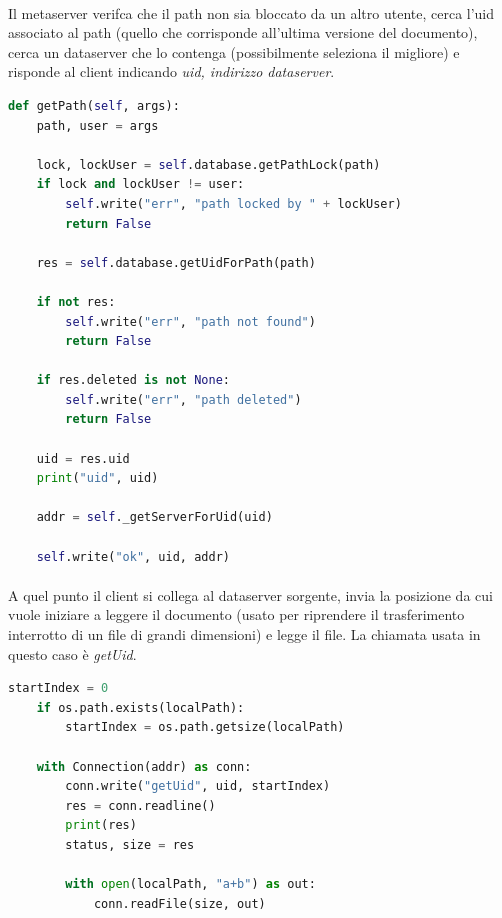 \documentclass{article}
\begin{document}
\paragraph{} Il metaserver verifca che il path non sia bloccato da un altro utente, cerca l'uid associato al path (quello che corrisponde all'ultima versione del documento), cerca un dataserver che lo contenga (possibilmente seleziona il migliore) e risponde al client indicando \emph{uid, indirizzo dataserver}.

\begin{lstlisting}[language=Python, title=Metaserver]
def getPath(self, args):
    path, user = args

    lock, lockUser = self.database.getPathLock(path)
    if lock and lockUser != user:
        self.write("err", "path locked by " + lockUser)
        return False

    res = self.database.getUidForPath(path)

    if not res:
        self.write("err", "path not found")
        return False

    if res.deleted is not None:
        self.write("err", "path deleted")
        return False

    uid = res.uid
    print("uid", uid)

    addr = self._getServerForUid(uid)

    self.write("ok", uid, addr)
\end{lstlisting}

\paragraph{} A quel punto il client si collega al dataserver sorgente, invia la posizione da cui vuole iniziare a leggere il documento (usato per riprendere il trasferimento interrotto di un file di grandi dimensioni) e legge il file. La chiamata usata in questo caso è \emph{getUid}. 

\begin{lstlisting}[language=Python, title=Client]
startIndex = 0
    if os.path.exists(localPath):
        startIndex = os.path.getsize(localPath)

    with Connection(addr) as conn:
        conn.write("getUid", uid, startIndex)
        res = conn.readline()
        print(res)
        status, size = res
    
        with open(localPath, "a+b") as out:
            conn.readFile(size, out)
\end{lstlisting}
\end{document}

